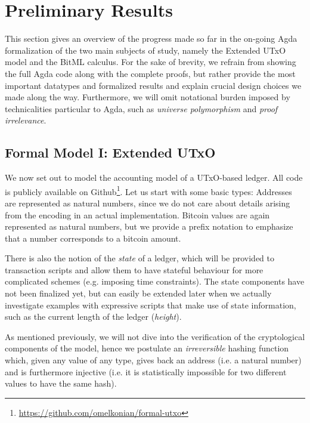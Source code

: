 \documentclass[acmsmall,nonacm=true,screen=true]{acmart}
\newcommand\site[1]{\footnote{\url{#1}}}
\begin{document}
\section{Preliminary Results}
\label{sec:results}
This section gives an overview of the progress made so far in the on-going Agda formalization of the two main subjects of study,
namely the Extended UTxO model and the BitML calculus.
For the sake of brevity, we refrain from showing the full Agda code along with the complete proofs, but rather
provide the most important datatypes and formalized results and explain crucial design choices we made along the way.
Furthermore, we will omit notational burden imposed by technicalities particular to Agda, such as \textit{universe polymorphism}
and \textit{proof irrelevance}.

\subsection{Formal Model I: Extended UTxO} \label{subsec:eutxo}
We now set out to model the accounting model of a UTxO-based ledger.
All code is publicly available on Github\site{https://github.com/omelkonian/formal-utxo}.
Let us start with some basic types:
\UTXObasicTypes{}
Addresses are represented as natural numbers, since we do not care about details arising from the encoding in an
actual implementation. Bitcoin values are again represented as natural numbers, but we provide a prefix notation
to emphasize that a number corresponds to a bitcoin amount.

There is also the notion of the \textit{state} of a ledger, which will be provided to transaction scripts and allow
them to have stateful behaviour for more complicated schemes (e.g. imposing time constraints).
\UTXOstate{}
The state components have not been finalized yet, but can easily be extended later when we actually investigate
examples with expressive scripts that make use of state information, such as the current length of the ledger (\textit{height}).

As mentioned previously, we will not dive into the verification of the cryptological components of the model,
hence we postulate an \textit{irreversible} hashing function which, given any value of any type,
gives back an address (i.e. a natural number) and is furthermore injective (i.e. it is statistically impossible for two different
values to have the same hash).
\UTXOhash{}
\end{document}

